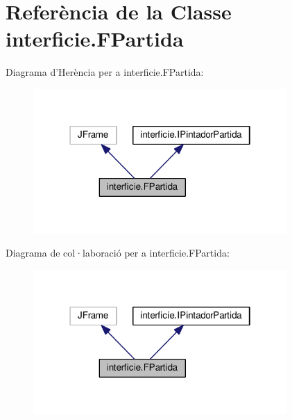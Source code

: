\hypertarget{classinterficie_1_1_f_partida}{\section{Referència de la Classe interficie.\+F\+Partida}
\label{classinterficie_1_1_f_partida}
}


Diagrama d'Herència per a interficie.\+F\+Partida\+:\nopagebreak
\begin{figure}[H]
\begin{center}
\leavevmode
\includegraphics[width=274pt]{classinterficie_1_1_f_partida__inherit__graph}
\end{center}
\end{figure}


Diagrama de col·laboració per a interficie.\+F\+Partida\+:\nopagebreak
\begin{figure}[H]
\begin{center}
\leavevmode
\includegraphics[width=274pt]{classinterficie_1_1_f_partida__coll__graph}
\end{center}
\end{figure}

